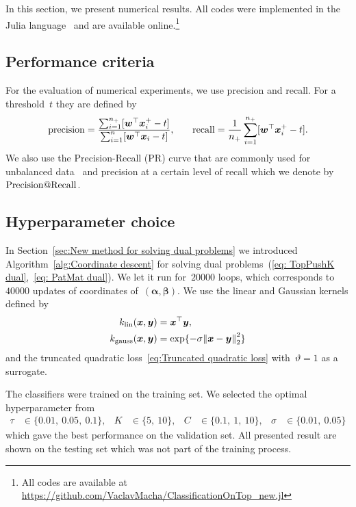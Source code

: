 In this section, we present numerical results. All codes were implemented in the Julia language~\cite{bezanson2017julia} and are available online.\footnote{All codes are available at \url{https://github.com/VaclavMacha/ClassificationOnTop_new.jl}}

\subsection{Performance criteria}

For the evaluation of numerical experiments, we use precision and recall. For a threshold~$t$ they are defined by
\begin{equation}\label{eq:prec_rec}
  \begin{alignedat}{2}
      \operatorname{precision}
      & = \frac{\sum_{i = 1}^{n_{+}} [\bm{w}^{\top}\bm{x}^+_{i} - t]}{\sum_{i = 1}^{n} [\bm{w}^{\top}\bm{x}_{i} - t]}, & \qquad
      \operatorname{recall}
      & = \frac{1}{n_{+}} \sum_{i = 1}^{n_{+}} [\bm{w}^{\top}\bm{x}^+_{i} - t].
  \end{alignedat}
\end{equation}
We also use the Precision-Recall (PR) curve that are commonly used for unbalanced data~\cite{davis2006relationship} and precision at a certain level of recall which we denote by~$\operatorname{Precision@Recall}$.

\subsection{Hyperparameter choice}

In Section~\ref{sec:New method for solving dual problems} we introduced Algorithm~\ref{alg:Coordinate descent} for solving dual problems~(\ref{eq: TopPushK dual},~\ref{eq: PatMat dual}). We let it run for~$20000$ \repeatloop loops, which corresponds to~$40000$ updates of coordinates of~$(\bm{\alpha},\bm{\beta})$. We use the linear and Gaussian kernels defined by
\begin{align}
  k_{\textrm{lin}}(\bm{x}, \bm{y})   & = \bm{x}^{\top} \bm{y}, \label{eq:Linear kernel} \\
  k_{\textrm{gauss}}(\bm{x}, \bm{y}) & = \exp\{-\sigma \norm{\bm{x} - \bm{y}}_2^2\} \label{eq:Gaussian kernel}
\end{align}
and the truncated quadratic loss~\eqref{eq:Truncated quadratic loss} with~$\vartheta = 1$ as a surrogate. 

The classifiers were trained on the training set. We selected the optimal hyperparameter from
\begin{equation*}
  \begin{aligned}
    \tau   & \in \{0.01,\ 0.05,\ 0.1\}, &
    K      & \in \{5,\ 10\}, &
    C      & \in \{0.1,\ 1,\ 10\}, &
    \sigma & \in \{0.01,\ 0.05\} 
  \end{aligned}
\end{equation*}
which gave the best performance on the validation set. All presented result are shown on the testing set which was not part of the training process.


